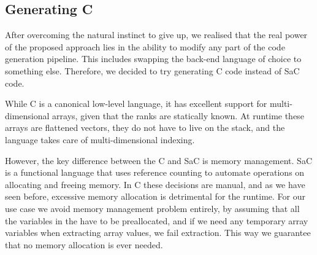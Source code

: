 \subsection{Generating C}

After overcoming the natural instinct to give up, we realised that the real
power of the proposed approach lies in the ability to modify any part of the
code generation pipeline.  This includes swapping the back-end language of choice
to something else.  Therefore, we decided to try generating C code instead of
SaC code.

While C is a canonical low-level language, it has excellent support for
multi-dimensional arrays, given that the ranks are statically known.
At runtime these arrays are flattened vectors, they do not have to live
on the stack, and the language takes care of multi-dimensional indexing.

However, the key difference between the C and SaC is memory management.
SaC is a functional language that uses reference counting to automate
operations on allocating and freeing memory.  In C these decisions are
manual, and as we have seen before, excessive memory allocation is detrimental
for the runtime.  For our use case we avoid memory management problem
entirely, by assuming that all the variables in the  have
to be preallocated, and if we need any temporary array variables when
extracting array values, we fail extraction.  This way we guarantee
that no memory allocation is ever needed.

